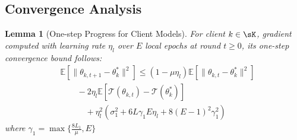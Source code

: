 \documentclass[lettersize,journal]{IEEEtran}
\newtheorem{lemma}{Lemma}
\begin{document}
\subsection{Convergence Analysis}
\begin{lemma}[One-step Progress for Client Models]
\label{lemma:1}
For client $k \in \sK$, gradient computed with learning rate $\eta_l$ over $E$ local epochs at round $t \geq 0$, its one-step convergence bound follows:
\begin{equation}
\begin{split}
    &\mathbb{E}[\|\theta_{k,t+1} - \theta_k^*\|^2] \leq (1-\mu\eta_l)\mathbb{E}[\|\theta_{k,t}  - \theta_k^*\|^2]\\
    & \qquad - 2\eta_l\mathbb{E}[\mathcal{T}(\theta_{k,t}) - \mathcal{T}(\theta_k^*)]\\ 
    & \qquad \quad + \eta_l^2\left(\sigma_1^2 + 6L\gamma_1 E\eta_l + 8(E-1)^2\gamma_1^2\right)
\end{split}
\end{equation}
where $\gamma_1 = \max\{\frac{8L_1}{\mu}, E\}$
\end{lemma}
\end{document}
